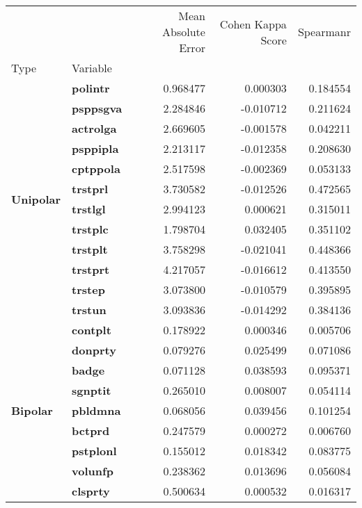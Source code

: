 \begin{table}[H]
    \begin{tabular}{llrrr}
    \toprule
     &  & Mean Absolute Error & Cohen Kappa Score & Spearmanr \\
    Type & Variable &  &  &  \\
    \midrule
    \multirow[t]{12}{*}{\textbf{Unipolar}} & \textbf{polintr} & 0.968477 & 0.000303 & 0.184554 \\
    \textbf{} & \textbf{psppsgva} & 2.284846 & -0.010712 & 0.211624 \\
    \textbf{} & \textbf{actrolga} & 2.669605 & -0.001578 & 0.042211 \\
    \textbf{} & \textbf{psppipla} & 2.213117 & -0.012358 & 0.208630 \\
    \textbf{} & \textbf{cptppola} & 2.517598 & -0.002369 & 0.053133 \\
    \textbf{} & \textbf{trstprl} & 3.730582 & -0.012526 & 0.472565 \\
    \textbf{} & \textbf{trstlgl} & 2.994123 & 0.000621 & 0.315011 \\
    \textbf{} & \textbf{trstplc} & 1.798704 & 0.032405 & 0.351102 \\
    \textbf{} & \textbf{trstplt} & 3.758298 & -0.021041 & 0.448366 \\
    \textbf{} & \textbf{trstprt} & 4.217057 & -0.016612 & 0.413550 \\
    \textbf{} & \textbf{trstep} & 3.073800 & -0.010579 & 0.395895 \\
    \textbf{} & \textbf{trstun} & 3.093836 & -0.014292 & 0.384136 \\
    \cline{1-5}
    \multirow[t]{29}{*}{\textbf{Bipolar}} & \textbf{contplt} & 0.178922 & 0.000346 & 0.005706 \\
    \textbf{} & \textbf{donprty} & 0.079276 & 0.025499 & 0.071086 \\
    \textbf{} & \textbf{badge} & 0.071128 & 0.038593 & 0.095371 \\
    \textbf{} & \textbf{sgnptit} & 0.265010 & 0.008007 & 0.054114 \\
    \textbf{} & \textbf{pbldmna} & 0.068056 & 0.039456 & 0.101254 \\
    \textbf{} & \textbf{bctprd} & 0.247579 & 0.000272 & 0.006760 \\
    \textbf{} & \textbf{pstplonl} & 0.155012 & 0.018342 & 0.083775 \\
    \textbf{} & \textbf{volunfp} & 0.238362 & 0.013696 & 0.056084 \\
    \textbf{} & \textbf{clsprty} & 0.500634 & 0.000532 & 0.016317 \\

\end{tabular}
\end{table}
